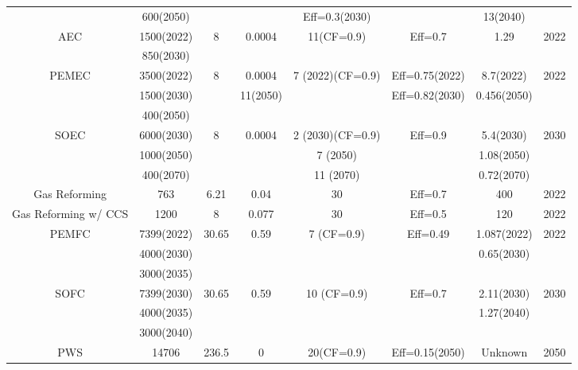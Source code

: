 \begin{landscape}
\begin{longtable}{ |*{8}{c|} }
  & 600(2050) &  &  & Eff=0.3(2030) &  & 13(2040) &  \\
\gls{AEC} & 1500(2022) & 8 & 0.0004 & 11(CF=0.9) & Eff=0.7 & 1.29 & 2022\\
 & 850(2030) &  &  &  &  & &  \\
\gls{PEMEC} & 3500(2022) & 8 & 0.0004 & 7 (2022)(CF=0.9) & Eff=0.75(2022) & 8.7(2022) & 2022\\
 & 1500(2030) &  & 11(2050)  &  & Eff=0.82(2030) & 0.456(2050)  &  \\
 & 400(2050) &  &  &  & &  &  \\
\gls{SOEC} & 6000(2030) & 8 & 0.0004 & 2 (2030)(CF=0.9) & Eff=0.9 & 5.4(2030) & 2030\\
 & 1000(2050) &  &  & 7 (2050) &  & 1.08(2050) & \\
 & 400(2070) &  &  & 11 (2070) &  & 0.72(2070) & \\
Gas Reforming & 763 & 6.21 & 0.04 & 30  & Eff=0.7 & 400 & 2022\\
Gas Reforming w/ CCS & 1200 & 8 & 0.077 & 30 & Eff=0.5 & 120 & 2022\\
\gls{PEMFC} & 7399(2022) & 30.65 & 0.59 & 7 (CF=0.9) & Eff=0.49 & 1.087(2022) & 2022\\
 & 4000(2030) &  &  &  &  & 0.65(2030) &  \\
 & 3000(2035) &  &  &  &  &  &  \\
\gls{SOFC} & 7399(2030) & 30.65 & 0.59 & 10 (CF=0.9) & Eff=0.7 & 2.11(2030) & 2030\\
 & 4000(2035) &  &  &  &  & 1.27(2040) &  \\
 & 3000(2040) &  &  &  &  & &  \\
\gls{PWS} & 14706  & 236.5 & 0 & 20(CF=0.9) & Eff=0.15(2050) & Unknown & 2050
\label{eco}
\end{longtable}
\end{landscape}


